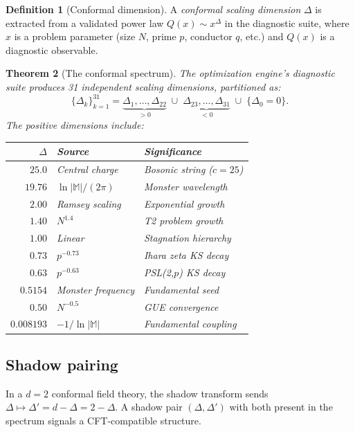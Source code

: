 \documentclass[11pt]{amsart}
\newtheorem{theorem}{Theorem}[section]
\theoremstyle{definition}
\newtheorem{definition}[theorem]{Definition}
\begin{document}
\begin{definition}[Conformal dimension]
A \emph{conformal scaling dimension} $\Delta$ is extracted from a validated power law $Q(x) \sim x^{\Delta}$ in the diagnostic suite, where $x$ is a problem parameter (size $N$, prime $p$, conductor $q$, etc.) and $Q(x)$ is a diagnostic observable.
\end{definition}

\begin{theorem}[The conformal spectrum]\label{thm:spectrum}
The optimization engine's diagnostic suite produces 31 independent scaling dimensions, partitioned as:
\[
\{\Delta_k\}_{k=1}^{31} = \underbrace{\Delta_1, \ldots, \Delta_{22}}_{> 0} \;\cup\; \underbrace{\Delta_{23}, \ldots, \Delta_{31}}_{< 0} \;\cup\; \{\Delta_0 = 0\}.
\]
The positive dimensions include:
\begin{center}
\begin{tabular}{r l l}
\toprule
$\Delta$ & Source & Significance \\
\midrule
$25.0$ & Central charge & Bosonic string ($c = 25$) \\
$19.76$ & $\ln|\mathbb{M}|/(2\pi)$ & Monster wavelength \\
$2.00$ & Ramsey scaling & Exponential growth \\
$1.40$ & $N^{1.4}$ & T2 problem growth \\
$1.00$ & Linear & Stagnation hierarchy \\
$0.73$ & $p^{-0.73}$ & Ihara zeta KS decay \\
$0.63$ & $p^{-0.63}$ & PSL(2,$p$) KS decay \\
$0.5154$ & Monster frequency & Fundamental seed \\
$0.50$ & $N^{-0.5}$ & GUE convergence \\
$0.008193$ & $-1/\ln|\mathbb{M}|$ & Fundamental coupling \\
\bottomrule
\end{tabular}
\end{center}
\end{theorem}

\subsection{Shadow pairing}

In a $d = 2$ conformal field theory, the shadow transform sends $\Delta \mapsto \Delta' = d - \Delta = 2 - \Delta$. A shadow pair $(\Delta, \Delta')$ with both present in the spectrum signals a CFT-compatible structure.
\end{document}
